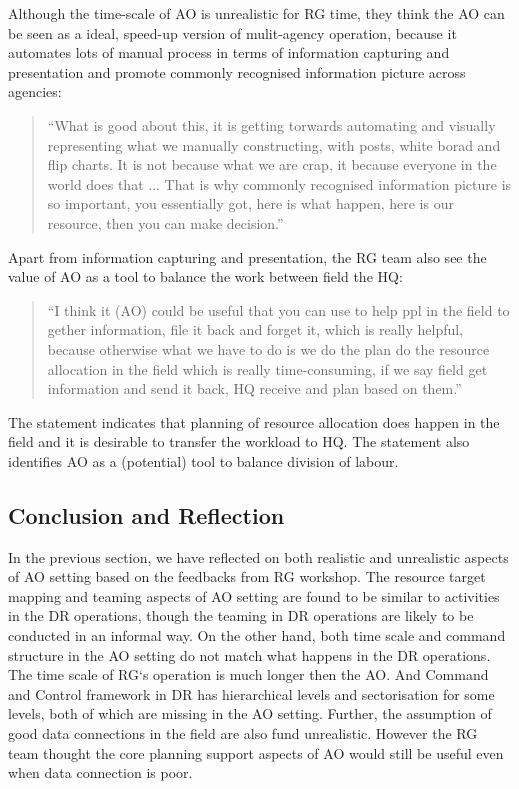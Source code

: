 Although the time-scale of AO is unrealistic for RG time,  they think the AO can be seen as a ideal, speed-up version of mulit-agency operation, because it automates lots of manual process in terms of information capturing and presentation and promote commonly recognised information picture across agencies:

\begin{quotation}
``What is good about this, it is getting torwards automating and visually representing what we manually constructing, with posts, white borad and flip charts. It is not because what we are crap, it because everyone in the world does that ...  That is why commonly recognised information picture is so important, you essentially got, here is what happen, here is our resource, then you can make decision.''
\end{quotation}

Apart from information capturing and presentation, the RG team also see the value of AO as a tool to balance the work between field the HQ: 

\begin{quotation}
``I think it (AO) could be useful that you can use to help ppl in the field to gether information, file it back and forget it, which is really helpful, because otherwise what we have to do is we do the plan do the resource allocation in the field which is really time-consuming, if we say field get information and send it back, HQ receive and plan based on them.''
\end{quotation}

The statement indicates that planning of resource allocation does happen in the field and it is desirable to transfer the workload to HQ. The statement also identifies AO as a (potential) tool to balance division of labour. \\


\subsection{Conclusion and Reflection}
In the previous section, we have reflected on both realistic and unrealistic aspects of AO setting based on the feedbacks from RG workshop. The resource target mapping and teaming aspects of AO setting are found to be similar to activities in the DR operations, though the teaming in DR operations are likely to be conducted in an informal way. On the other hand, both time scale and command structure in the AO setting do not match what happens in the DR operations. The time scale of RG`s operation is much longer then the AO. And Command and Control framework in DR has hierarchical levels and sectorisation for some levels, both of which are missing in the AO setting. Further, the assumption of good data connections in the field are also fund unrealistic. However the RG team thought the core planning support aspects of AO would still be useful even when data connection is poor. \\

